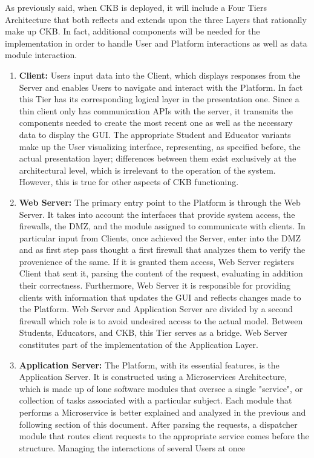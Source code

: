 As previously said, when CKB is deployed, it will include a Four Tiers Architecture that both reflects and extends upon the three Layers that rationally make up CKB.
In fact, additional components will be needed for the implementation in order to handle User and Platform interactions as well as data module interaction.
\begin{enumerate}[label=$\bullet$]
    \item \textbf{Client:} Users input data into the Client, which displays responses from the Server and enables Users to navigate and interact with the Platform. In fact this Tier has its corresponding logical layer in the presentation one. 
    Since a thin client only has communication APIs with the server, it transmits the components needed to create the most recent one as well as the necessary data to display the GUI.
    The appropriate Student and Educator variants make up the User visualizing interface, representing, as specified before, the actual presentation layer; differences between them exist exclusively at the architectural level, which is irrelevant to the operation of the system. However, this is true for other aspects of CKB functioning.
    \item \textbf{Web Server:} The primary entry point to the Platform is through the Web Server. It takes into account the interfaces that provide system access, the firewalls, the DMZ, and the module assigned to communicate with 
    clients. In particular input from Clients, once achieved the Server, enter into the DMZ and as first step pass thought a first firewall that analyzes them to verify the provenience of the same. If it is granted them access, Web Server registers Client that sent it, parsing the content of the request, evaluating in addition their correctness. 
    Furthermore, Web Server it is responsible for providing clients with information that updates the GUI and reflects changes made to the Platform. Web Server and Application Server are divided by a second firewall which role is to avoid undesired access to the actual model. Between Students, Educators, 
    and CKB, this Tier serves as a bridge. Web Server constitutes part of the implementation of the Application Layer.
    \item \textbf{Application Server:} The Platform, with its essential features, is the Application Server. It is constructed using a Microservices Architecture, which is made up of lone software modules that oversee a single 
    "service", or collection of tasks associated with a particular subject. Each module that performs a Microservice is better explained and analyzed in the previous and following section of this document. After parsing the requests, a dispatcher module that routes client requests to the appropriate service comes before the structure. Managing the interactions of several Users at once 

\end{enumerate}
